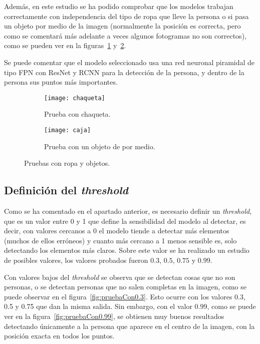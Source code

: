 {Además, en este estudio se ha podido comprobar que los modelos trabajan correctamente con independencia del tipo de ropa que lleve la persona o si pasa un objeto por medio de la imagen (normalmente la posición es correcta, pero como se comentará más adelante a veces algunos fotogramas no son correctos), como se pueden ver en la figuras~\ref{fig:chaqueta} y~\ref{fig:caja}.

Se puede comentar que el modelo seleccionado usa una red neuronal piramidal de tipo FPN con ResNet y RCNN para la detección de la persona, y dentro de la persona sus puntos más importantes.

\begin{figure}[ht]
	\begin{subfigure}{.5\textwidth}
		\centering
		\texttt{[image: chaqueta]}
		\caption{Prueba con chaqueta.}
		\label{fig:chaqueta}
	\end{subfigure}
	\begin{subfigure}{.5\textwidth}
		\centering
		\texttt{[image: caja]}
		\caption{Prueba con un objeto de por medio.}
		\label{fig:caja}
	\end{subfigure}
	\caption{Pruebas con ropa y objetos.}
	\label{fig:ropobj}
\end{figure}



\subsection{Definición del \textit{threshold}}
Como se ha comentado en el apartado anterior, es necesario definir un \textit{threshold}, que es un valor entre 0 y 1 que define la sensibilidad del modelo al detectar, es decir, con valores cercanos a 0 el modelo tiende a detectar más elementos (muchos de ellos erróneos) y cuanto más cercano a 1 menos sensible es, solo detectando los elementos más claros. Sobre este valor se ha realizado un estudio de posibles valores, los valores probados fueron $0.3$, $0.5$, $0.75$ y $0.99$.

Con valores bajos del \textit{threshold} se observa que se detectan cosas que no son personas, o se detectan personas que no salen completas en la imagen, como se puede observar en el figura~\ref{fig:pruebaCon0.3}. Esto ocurre con los valores 0.3, 0.5 y 0.75 que dan la misma salida. Sin embargo, con el valor $0.99$, como se puede ver en la figura~\ref{fig:pruebaCon0.99}, se obtienen muy buenos resultados detectando únicamente a la persona que aparece en el centro de la imagen, con la posición exacta en todos los puntos.

}
